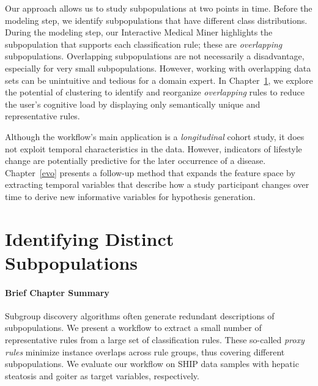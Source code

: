 \documentclass[
  oneside]{book}
\newenvironment{infobox}[1]
  {
  \begin{chapter-summary}
  }
  {
  \end{chapter-summary}
  }
\begin{document}
Our approach allows us to study subpopulations at two points in time.
Before the modeling step, we identify subpopulations that have different class distributions.
During the modeling step, our Interactive Medical Miner highlights the subpopulation that supports each classification rule; these are \emph{overlapping} subpopulations.
Overlapping subpopulations are not necessarily a disadvantage, especially for very small subpopulations.
However, working with overlapping data sets can be unintuitive and tedious for a domain expert.
In Chapter~\ref{sdclu}, we explore the potential of clustering to identify and reorganize \emph{overlapping} rules to reduce the user's cognitive load by displaying only semantically unique and representative rules.

Although the workflow's main application is a \emph{longitudinal} cohort study, it does not exploit temporal characteristics in the data.
However, indicators of lifestyle change are potentially predictive for the later occurrence of a disease.
Chapter~\ref{evo} presents a follow-up method that expands the feature space by extracting temporal variables that describe how a study participant changes over time to derive new informative variables for hypothesis generation.

\hypertarget{sdclu}{%
\chapter{Identifying Distinct Subpopulations}\label{sdclu}}

\begin{infobox}{tasks.pdf}

\hypertarget{brief-chapter-summary-1}{%
\subsubsection*{Brief Chapter Summary}\label{brief-chapter-summary-1}}

Subgroup discovery algorithms often generate redundant descriptions of subpopulations.
We present a workflow to extract a small number of representative rules from a large set of classification rules.
These so-called \emph{proxy rules} minimize instance overlaps across rule groups, thus covering different subpopulations.
We evaluate our workflow on SHIP data samples with hepatic steatosis and goiter as target variables, respectively.

\end{infobox}
\end{document}
